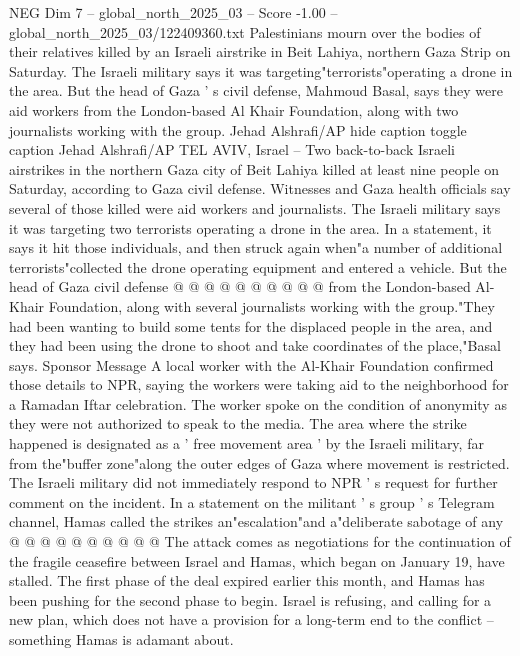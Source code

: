 \begin{textsample}{NEG Dim 7 – global\_north\_2025\_03 – Score -1.00 – global\_north\_2025\_03/122409360.txt}  \label{ex:f7_neg_139}
Palestinians mourn over the bodies of their relatives killed by an Israeli airstrike in Beit Lahiya, northern Gaza Strip on Saturday.
The Israeli military says it was targeting"terrorists"operating a drone in the area.
But the head of Gaza ' s civil defense, Mahmoud Basal, says they were aid workers from the London-based Al Khair Foundation, along with two journalists working with the group.
Jehad Alshrafi/AP hide caption toggle caption Jehad Alshrafi/AP TEL AVIV, Israel -- Two back-to-back Israeli airstrikes in the northern Gaza city of Beit Lahiya killed at least nine people on Saturday, according to Gaza civil defense.
Witnesses and Gaza health officials say several of those killed were aid workers and journalists.
The Israeli military says it was targeting two terrorists operating a drone in the area.
In a statement, it says it hit those individuals, and then struck again when"a number of additional terrorists"collected the drone operating equipment and entered a vehicle.
But the head of Gaza civil defense @ @ @ @ @ @ @ @ @ @ from the London-based Al-Khair Foundation, along with several journalists working with the group."They had been wanting to build some tents for the displaced people in the area, and they had been using the drone to shoot and take coordinates of the place,"Basal says.
Sponsor Message A local worker with the Al-Khair Foundation confirmed those details to NPR, saying the workers were taking aid to the neighborhood for a Ramadan Iftar celebration.
The worker spoke on the condition of anonymity as they were not authorized to speak to the media.
The area where the strike happened is designated as a ' free movement area ' by the Israeli military, far from the"buffer zone"along the outer edges of Gaza where movement is restricted.
The Israeli military did not immediately respond to NPR ' s request for further comment on the incident.
In a statement on the militant ' s group ' s Telegram channel, Hamas called the strikes an"escalation"and a"deliberate sabotage of any @ @ @ @ @ @ @ @ @ @ The attack comes as negotiations for the continuation of the fragile ceasefire between Israel and Hamas, which began on January 19, have stalled.
The first phase of the deal expired earlier this month, and Hamas has been pushing for the second phase to begin.
Israel is refusing, and calling for a new plan, which does not have a provision for a long-term end to the conflict -- something Hamas is adamant about.

\end{textsample}
